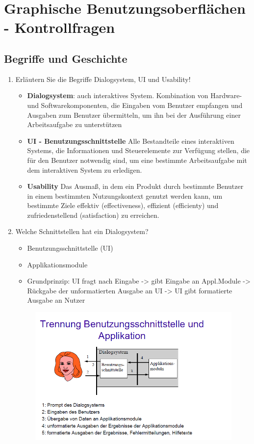 \section{Graphische Benutzungsoberflächen - Kontrollfragen}
\subsection{Begriffe und Geschichte}
\begin{enumerate}
	\item Erläutern Sie die Begriffe Dialogsystem, UI und Usability!
	\begin{itemize}
		\item \textbf{Dialogsystem}: auch interaktives System. Kombination von Hardware- und Softwarekomponenten, die Eingaben vom Benutzer empfangen und Ausgaben zum Benutzer übermitteln, um ihn bei der Ausführung einer Arbeitsaufgabe zu unterstützen
		\item \textbf{UI - Benutzungsschnittstelle} Alle Bestandteile eines interaktiven Systems, die Informationen und Steuerelemente zur Verfügung stellen, die für den Benutzer notwendig sind, um eine bestimmte Arbeitsaufgabe mit dem interaktiven System zu erledigen. 
		\item \textbf{Usability} Das Ausmaß, in dem ein Produkt durch bestimmte Benutzer in einem bestimmten Nutzungskontext genutzt werden kann, um bestimmte Ziele effektiv (effectiveness), effizient (efficienty) und zufriedenstellend (satisfaction) zu erreichen.
	\end{itemize}
	
	\item Welche Schnittstellen hat ein Dialogsystem?
	\begin{itemize}
		\item Benutzungsschnittstelle (UI)
		\item Applikationsmodule
		\item Grundprinzip: UI fragt nach Eingabe -> gibt Eingabe an Appl.Module -> Rückgabe der unformatierten Ausgabe an UI -> UI gibt formatierte Ausgabe an Nutzer
	\end{itemize}
	\begin{figure}[!h]
		\centering
		\includegraphics[scale=0.5]{img/ui.png}
	\end{figure}
	

\end{enumerate}
